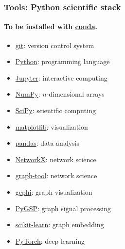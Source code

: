\documentclass[aspectratio=169]{beamer}
\begin{document}
\begin{frame}
	\frametitle{Tools: Python scientific stack}
	\framesubtitle{To be installed with \href{https://conda.io}{conda}.}
	\begin{minipage}{0.45\linewidth}
	\begin{itemize}
		\item \href{https://git-scm.com}{git}: version control system
		\vspace{0.7em}
		\item \href{https://www.python.org}{Python}: programming language
		\vspace{0.7em}
		\item \href{https://jupyter.org}{Jupyter}: interactive computing
		\vspace{0.7em}
		\item \href{http://www.numpy.org}{NumPy}: $n$-dimensional arrays
		\vspace{0.7em}
		\item \href{https://www.scipy.org/scipylib}{SciPy}: scientific computing
		\vspace{0.7em}
		\item \href{https://matplotlib.org}{matplotlib}: visualization
		\vspace{0.7em}
		\item \href{https://pandas.pydata.org}{pandas}: data analysis
	\end{itemize}
	\end{minipage}
	\hfill
	\begin{minipage}{0.45\linewidth}
	\begin{itemize}
		\item \href{https://networkx.github.io}{NetworkX}: network science
		\vspace{0.7em}
		\item \href{https://graph-tool.skewed.de}{graph-tool}: network science
		\vspace{0.7em}
		\item \href{https://gephi.org}{gephi}: graph visualization
		\vspace{0.7em}
		\item \href{https://github.com/epfl-lts2/pygsp}{PyGSP}: graph signal processing
		\vspace{0.7em}
		\item \href{https://scikit-learn.org}{scikit-learn}: graph embedding
		\vspace{0.7em}
		\item \href{https://pytorch.org}{PyTorch}: deep learning
	\end{itemize}
	\end{minipage}
\end{frame}
\end{document}
